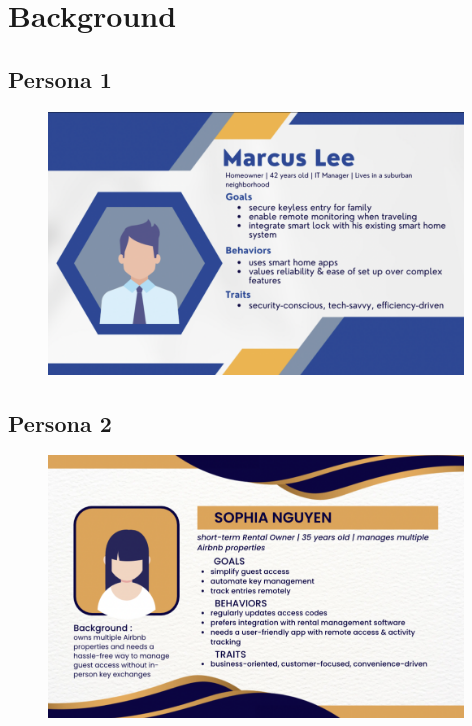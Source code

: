 \section{Background}

\subsection*{Persona 1}
\begin{figure}[!ht]
    \centering
    \includegraphics[width=110mm,scale=0.4]{./img/Persona1.png}
    \label{fig:persona1}
\end{figure}

\subsection*{Persona 2}
\begin{figure}[!ht]
    \centering
    \includegraphics[width=110mm,scale=0.4]{./img/Persona2.png}
    \label{fig:persona2}
\end{figure}
\newpage
